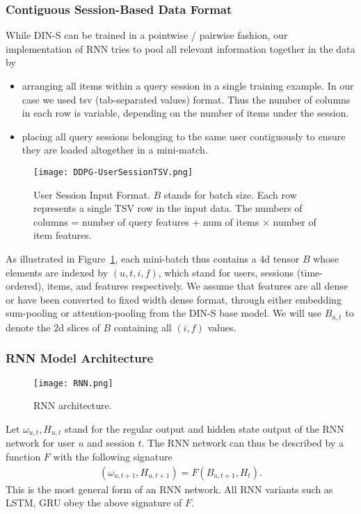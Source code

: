 \subsubsection{Contiguous Session-Based Data Format}
\label{subsubsec:data_format}
While DIN-S can be trained in a pointwise / pairwise fashion, our implementation of RNN tries to pool all relevant information together in the data by 
\begin{itemize}
    \item arranging all items within a query session in a single training example. In our case we used tsv (tab-separated values) format. Thus the number of columns in each row is variable, depending on the number of items under the session.
    \item placing all query sessions belonging to the same user contiguously to ensure they are loaded altogether in a mini-match.
\end{itemize}
\begin{figure}
    \centering
    \texttt{[image: DDPG-UserSessionTSV.png]}
    \centering
    \caption{User Session Input Format. $B$ stands for batch size. Each row represents a single TSV row in the input data. The numbers of columns = number of query features + num of items $\times$ number of item features.}
    \label{fig:user_session_tsv}
\vspace{-5pt}
\end{figure}
As illustrated in Figure~\ref{fig:user_session_tsv}, each mini-batch thus contains a 4d tensor $B$ whose elements are indexed by $(u, t, i, f)$, which stand for users, sessions (time-ordered), items, and features respectively. We assume that features are all dense or have been converted to fixed width dense format, through either embedding sum-pooling or 
attention-pooling from the DIN-S base model. We will use $B_{u, t}$ to denote the 2d slices of $B$ containing all $(i, f)$ values. 

\subsubsection{RNN Model Architecture}
\begin{figure}
    \centering
    \texttt{[image: RNN.png]}
    \centering
    \caption{RNN architecture.}
    \label{fig:rnn}
\end{figure}
Let $\omega_{u, t}, H_{u, t}$ stand for the regular output and hidden state output of the RNN network for user $u$ and session $t$. The RNN network can thus be described by a function $F$ with the following signature
\begin{align} \label{eq:rnn_kernel}
    (\omega_{u, t+1}, H_{u, t+1}) = F(B_{u, t + 1}, H_t).
\end{align}
This is the most general form of an RNN network. All RNN variants such as LSTM, GRU obey the above signature of $F$.

